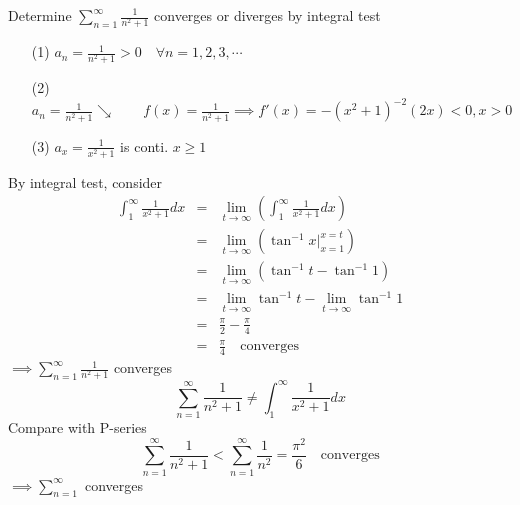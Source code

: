 \begin{eg}
Determine \(\displaystyle \sum^{\infty}_{n = 1} \frac{1}{n^2 +1}\) converges or diverges by integral test

\soln
\begin{itemize}
\item[(1)] \(\displaystyle a_n = \frac{1}{n^2 + 1} > 0 \quad \forall n = 1, 2, 3, \cdots\)
\item[(2)] \(\displaystyle a_n =\frac{1}{n^2 + 1} \searrow \quad \quad f(x) = \frac{1}{n^2 + 1} \implies f'(x) = -(x^2 + 1)^{-2}(2x) < 0, x> 0\)
\item[(3)] \(a_x = \frac{1}{x^2 + 1}\) is conti. \(x \geq 1\)
\end{itemize}
By integral test, consider
\[\begin{array}{rcl}
\displaystyle \int^{\infty}_1 \frac{1}{x^2 + 1} dx & = & \displaystyle \lim_{t \to \infty} (\int^{\infty}_1 \frac{1}{x^2 + 1} dx)\\
& = & \displaystyle \lim_{t \to \infty} (\tan^{-1} x \Big|^{x = t}_{x = 1})\\
& = & \displaystyle \lim_{t \to \infty} (\tan^{-1} t - \tan^{-1} 1)\\
& = & \displaystyle \lim_{t \to \infty} \tan^{-1} t - \lim_{t \to \infty} \tan^{-1} 1\\
& = & \displaystyle \frac{\pi}{2} - \frac{\pi}{4}\\
& = & \displaystyle \frac{\pi}{4} \quad \text{converges}
\end{array}\]
\(\implies \displaystyle \sum^{\infty}_{n = 1} \frac{1}{n^2 +1}\) converges
\[\displaystyle \sum^{\infty}_{n = 1} \frac{1}{n^2 + 1} \neq \int^{\infty}_1 \frac{1}{x^2 + 1} dx\]
Compare with P-series\\
\[\displaystyle \sum^{\infty}_{n = 1} \frac{1}{n^2 + 1} < \sum^{\infty}_{n = 1} \frac{1}{n^2} = \frac{\pi^2}{6}\quad \text{converges}\]
\(\implies \displaystyle \sum^{\infty}_{n = 1} \) converges
\end{eg}
